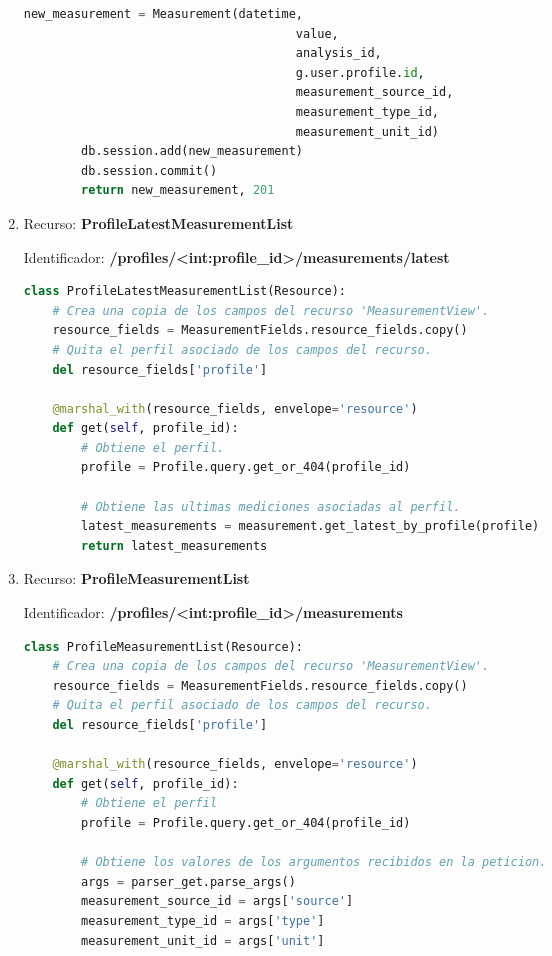 \begin{enumerate}
\begin{lstlisting}[language=Python]
        new_measurement = Measurement(datetime,
                                      value,
                                      analysis_id,
                                      g.user.profile.id,
                                      measurement_source_id,
                                      measurement_type_id,
                                      measurement_unit_id)
        db.session.add(new_measurement)
        db.session.commit()
        return new_measurement, 201
\end{lstlisting}

\item Recurso: \textbf{ProfileLatestMeasurementList}

Identificador: \textbf{/profiles/<int:profile\_id>/measurements/latest}

\begin{lstlisting}[language=Python]
class ProfileLatestMeasurementList(Resource):
    # Crea una copia de los campos del recurso 'MeasurementView'.
    resource_fields = MeasurementFields.resource_fields.copy()
    # Quita el perfil asociado de los campos del recurso.
    del resource_fields['profile']

    @marshal_with(resource_fields, envelope='resource')
    def get(self, profile_id):
        # Obtiene el perfil.
        profile = Profile.query.get_or_404(profile_id)

        # Obtiene las ultimas mediciones asociadas al perfil.
        latest_measurements = measurement.get_latest_by_profile(profile)
        return latest_measurements
\end{lstlisting}

\item Recurso: \textbf{ProfileMeasurementList}

Identificador: \textbf{/profiles/<int:profile\_id>/measurements}

\begin{lstlisting}[language=Python]
class ProfileMeasurementList(Resource):
    # Crea una copia de los campos del recurso 'MeasurementView'.
    resource_fields = MeasurementFields.resource_fields.copy()
    # Quita el perfil asociado de los campos del recurso.
    del resource_fields['profile']

    @marshal_with(resource_fields, envelope='resource')
    def get(self, profile_id):
        # Obtiene el perfil
        profile = Profile.query.get_or_404(profile_id)

        # Obtiene los valores de los argumentos recibidos en la peticion.
        args = parser_get.parse_args()
        measurement_source_id = args['source']
        measurement_type_id = args['type']
        measurement_unit_id = args['unit']


\end{lstlisting}
\end{enumerate}
